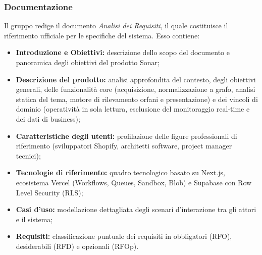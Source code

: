 \subsubsection{Documentazione}
Il gruppo redige il documento \emph{Analisi dei Requisiti}, il quale costituisce il riferimento ufficiale per le specifiche del sistema. Esso contiene:
\begin{itemize}
    \item \textbf{Introduzione e Obiettivi:} descrizione dello scopo del documento e panoramica degli obiettivi del prodotto Sonar;
    \item \textbf{Descrizione del prodotto:} analisi approfondita del contesto, degli obiettivi generali, delle funzionalità core (acquisizione, normalizzazione a grafo, analisi statica del tema, motore di rilevamento orfani e presentazione) e dei vincoli di dominio (operatività in sola lettura, esclusione del monitoraggio real-time e dei dati di business);
    \item \textbf{Caratteristiche degli utenti:} profilazione delle figure professionali di riferimento (sviluppatori Shopify, architetti software, project manager tecnici);
    \item \textbf{Tecnologie di riferimento:} quadro tecnologico basato su Next.js, ecosistema Vercel (Workflows, Queues, Sandbox, Blob) e Supabase con Row Level Security (RLS);
    \item \textbf{Casi d'uso:} modellazione dettagliata degli scenari d'interazione tra gli attori e il sistema;
    \item \textbf{Requisiti:} classificazione puntuale dei requisiti in obbligatori (RFO), desiderabili (RFD) e opzionali (RFOp).
\end{itemize}

